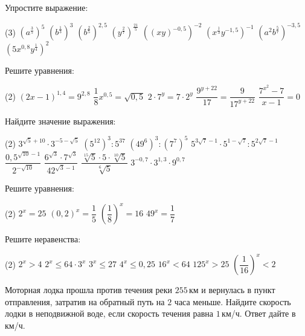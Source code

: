\begin{homework}[number=2]
	\begin{listofex}
		\item Упростите выражение:
		\begin{tasks}(3)
			\task \( (a^{\tfrac{3}{5}})^5 \)
			\task \( (b^{\tfrac{1}{3}})^3 \)
			\task \( (b^{\tfrac{2}{5}})^{2,5} \)
			\task \( (y^{\tfrac{2}{7}})^{\tfrac{21}{5}} \)
			\task \( ((xy)^{-0,5})^{-2} \)
			\task \( (x^{\tfrac{1}{3}}y^{-1,5})^{-1} \)
			\task \( (a^{2}b^{\tfrac{5}{7}})^{-3,5} \)
			\task \( (5x^{0,8}y^{\tfrac{1}{4}})^{2} \)
		\end{tasks}
		\item Решите уравнения:
		\begin{tasks}(2)
			\task \( (2x-1)^{1,4}=9^{2,8} \)
			\task \( \dfrac{1}{8}x^{0,5} = \sqrt{0,5} \)
			\task \( 2 \cdot 7^y = 7 \cdot 2^y \)
			\task \( \dfrac{9^{y+22}}{17}=\dfrac{9}{17^{y+22}} \)
			\task \( \dfrac{7^{x^2}-7}{x-1}=0 \)
		\end{tasks}
		\item Найдите значение выражения:
		\begin{tasks}(2)
			\task \( 3^{\sqrt{5}+10}\cdot3^{-5-\sqrt{5}} \)
			\task \( (5^{12})^3 : 5^{37} \)
			\task \( (49^6)^3:(7^7)^5 \)
			\task \( 5^{3\sqrt{7}-1}\cdot 5^{1-\sqrt{7}}:5^{2\sqrt{7}-1} \)
			\task \( \dfrac{0,5^{\sqrt{10}-1}}{2^{-\sqrt{10}}} \)
			\task \( \dfrac{6^{\sqrt{3}}\cdot7^{\sqrt{3}}}{42^{\sqrt{3}-1}} \)
			\task \( \dfrac{\sqrt[15]{5}\cdot5\cdot\sqrt[10]{5}}{\sqrt[6]{5}} \)
			\task \( 3^{-0,7}\cdot 3^{1,3} \cdot 9^{0,7}\)
		\end{tasks}
		\item Решите уравнения:
		\begin{tasks}(2)
			\task \( 2^x=25 \)
			\task \( (0,2)^x=\dfrac{1}{5} \)
			\task \( \left(\dfrac{1}{8}\right)^x=16 \)
			\task \( 49^x=\dfrac{1}{7} \)
		\end{tasks}
		\item Решите неравенства:
		\begin{tasks}(2)
			\task \( 2^x > 4 \)
			\task \( 2^x \le 64 \cdot 3^x \)
			\task \( 3^x \le 27 \)
			\task \( 4^x \le 0,25 \)
			\task \( 16^x < 64 \)
			\task \( 125^x > 25 \)
			\task \( \left( \dfrac{1}{16} \right)^x < 2 \)
		\end{tasks}
		\item Моторная лодка прошла против течения реки \(255\) км и вернулась в пункт отправления, затратив на обратный путь на \(2\) часа меньше. Найдите скорость лодки в неподвижной воде, если скорость течения равна \(1\) км/ч. Ответ дайте в км/ч.
	\end{listofex}
\end{homework}

